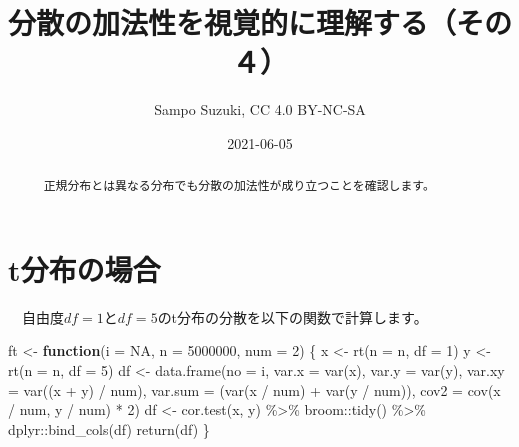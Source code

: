 \documentclass[a4paper]{tufte-handout}
\title[分散の加法性を視覚的に理解する（その４）]{分散の加法性を視覚的に理解する（その４）}
\author{Sampo Suzuki, CC 4.0 BY-NC-SA}
\date{2021-06-05}
\newenvironment{Shaded}{}{}
\newcommand{\AttributeTok}[1]{\textcolor[rgb]{0.49,0.56,0.16}{#1}}
\newcommand{\ConstantTok}[1]{\textcolor[rgb]{0.53,0.00,0.00}{#1}}
\newcommand{\ControlFlowTok}[1]{\textcolor[rgb]{0.00,0.44,0.13}{\textbf{#1}}}
\newcommand{\DecValTok}[1]{\textcolor[rgb]{0.25,0.63,0.44}{#1}}
\newcommand{\FunctionTok}[1]{\textcolor[rgb]{0.02,0.16,0.49}{#1}}
\newcommand{\NormalTok}[1]{#1}
\newcommand{\OtherTok}[1]{\textcolor[rgb]{0.00,0.44,0.13}{#1}}
\newcommand{\SpecialCharTok}[1]{\textcolor[rgb]{0.25,0.44,0.63}{#1}}
\begin{document}
\maketitle

\begin{abstract}
\noindent 　正規分布とは異なる分布でも分散の加法性が成り立つことを確認します。
\end{abstract}



\hypertarget{tux5206ux5e03ux306eux5834ux5408}{%
\section{\texorpdfstring{\textbf{t分布の場合}}{t分布の場合}}\label{tux5206ux5e03ux306eux5834ux5408}}

　自由度\(df = 1\)と\(df = 5\)のt分布の分散を以下の関数で計算します。

\begin{Shaded}
\begin{Highlighting}[numbers=left,,]
\NormalTok{ft }\OtherTok{\textless{}{-}} \ControlFlowTok{function}\NormalTok{(}\AttributeTok{i =} \ConstantTok{NA}\NormalTok{, }\AttributeTok{n =} \DecValTok{5000000}\NormalTok{, }\AttributeTok{num =} \DecValTok{2}\NormalTok{) \{}
\NormalTok{  x }\OtherTok{\textless{}{-}} \FunctionTok{rt}\NormalTok{(}\AttributeTok{n =}\NormalTok{ n, }\AttributeTok{df =} \DecValTok{1}\NormalTok{)}
\NormalTok{  y }\OtherTok{\textless{}{-}} \FunctionTok{rt}\NormalTok{(}\AttributeTok{n =}\NormalTok{ n, }\AttributeTok{df =} \DecValTok{5}\NormalTok{)}
\NormalTok{  df }\OtherTok{\textless{}{-}} \FunctionTok{data.frame}\NormalTok{(}\AttributeTok{no =}\NormalTok{ i,}
                   \AttributeTok{var.x =} \FunctionTok{var}\NormalTok{(x), }\AttributeTok{var.y =} \FunctionTok{var}\NormalTok{(y),}
                   \AttributeTok{var.xy =} \FunctionTok{var}\NormalTok{((x }\SpecialCharTok{+}\NormalTok{ y) }\SpecialCharTok{/}\NormalTok{ num), }\AttributeTok{var.sum =}\NormalTok{ (}\FunctionTok{var}\NormalTok{(x }\SpecialCharTok{/}\NormalTok{ num) }\SpecialCharTok{+} \FunctionTok{var}\NormalTok{(y }\SpecialCharTok{/}\NormalTok{ num)),}
                   \AttributeTok{cov2 =} \FunctionTok{cov}\NormalTok{(x }\SpecialCharTok{/}\NormalTok{ num, y }\SpecialCharTok{/}\NormalTok{ num) }\SpecialCharTok{*} \DecValTok{2}\NormalTok{)}
\NormalTok{  df }\OtherTok{\textless{}{-}} \FunctionTok{cor.test}\NormalTok{(x, y) }\SpecialCharTok{\%\textgreater{}\%}\NormalTok{ broom}\SpecialCharTok{::}\FunctionTok{tidy}\NormalTok{() }\SpecialCharTok{\%\textgreater{}\%}\NormalTok{ dplyr}\SpecialCharTok{::}\FunctionTok{bind\_cols}\NormalTok{(df)}
  \FunctionTok{return}\NormalTok{(df)}
\NormalTok{\}}
\end{Highlighting}
\end{Shaded}
\end{document}
